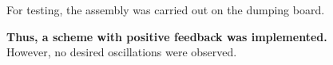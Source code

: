 For testing, the assembly was carried out on the dumping board.
\begin{center}
\end{center}

\hspace{-3mm}
\textbf{Thus, a scheme with positive feedback was implemented.} \\

\hspace{-3mm}
However, no desired oscillations were observed.

